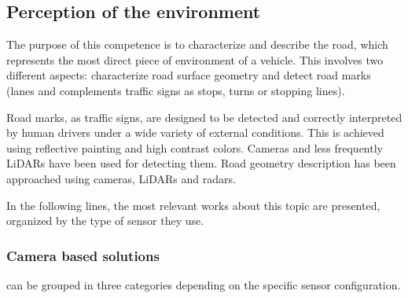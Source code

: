 \subsection{Perception of the environment}
The purpose of this competence is to characterize and describe the road, which
represents the most direct piece of environment of a vehicle. This 
involves two different aspects: characterize road surface geometry and detect road marks (lanes
and complements traffic signs as stops, turns or stopping lines).



Road marks, as traffic signs, are designed to be detected and 
correctly interpreted by human drivers under a wide variety of external 
conditions. This is achieved using reflective painting and high contrast 
colors. Cameras and less frequently LiDARs have been used for detecting them.
Road geometry description has been approached using cameras, LiDARs and radars.

In the following lines, the most relevant works about this topic are presented, 
organized by the type of sensor they use.


\subsubsection{Camera based solutions}
can be grouped in three categories depending on the specific sensor 
configuration.

